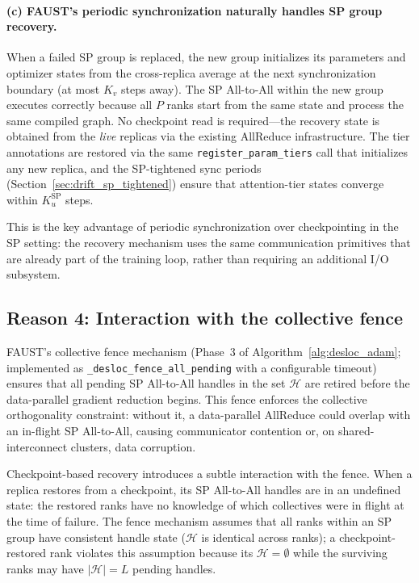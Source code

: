 \documentclass{article}
\begin{document}
\paragraph{(c) FAUST's periodic synchronization naturally handles
SP group recovery.}
When a failed SP group is replaced, the new group initializes its
parameters and optimizer states from the cross-replica average at the
next synchronization boundary (at most $K_v$ steps away). The SP
All-to-All within the new group executes correctly because all $P$ ranks
start from the same state and process the same compiled graph. No
checkpoint read is required---the recovery state is obtained from the
\emph{live} replicas via the existing AllReduce infrastructure.
The tier annotations are restored via the same
\texttt{register\_param\_tiers} call that initializes any new replica,
and the SP-tightened sync periods (Section~\ref{sec:drift_sp_tightened})
ensure that attention-tier states converge within $K_u^{\text{SP}}$
steps.

This is the key advantage of periodic synchronization over checkpointing
in the SP setting: the recovery mechanism uses the same communication
primitives that are already part of the training loop, rather than
requiring an additional I/O subsystem.

\subsection{Reason 4: Interaction with the collective fence}
\label{sec:checkpoint_fence}

FAUST's collective fence mechanism
(Phase~3 of Algorithm~\ref{alg:desloc_adam}; implemented as
\texttt{\_desloc\_fence\_all\_pending} with a configurable timeout)
ensures that all pending SP All-to-All handles in the set $\mathcal{H}$
are retired before the data-parallel gradient reduction begins.
This fence enforces the collective orthogonality constraint: without it,
a data-parallel AllReduce could overlap with an in-flight SP All-to-All,
causing communicator contention or, on shared-interconnect clusters,
data corruption.

Checkpoint-based recovery introduces a subtle interaction with the fence.
When a replica restores from a checkpoint, its SP All-to-All handles are
in an undefined state: the restored ranks have no knowledge of which
collectives were in flight at the time of failure. The fence mechanism
assumes that all ranks within an SP group have consistent handle state
($\mathcal{H}$ is identical across ranks); a checkpoint-restored rank
violates this assumption because its $\mathcal{H} = \emptyset$ while
the surviving ranks may have $|\mathcal{H}| = L$ pending handles.
\end{document}
